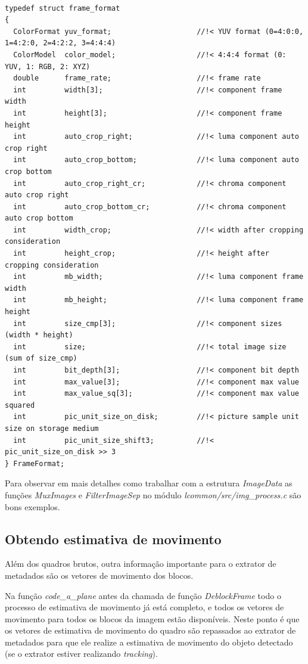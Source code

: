 \begin{lstlisting}

typedef struct frame_format
{
  ColorFormat yuv_format;                    //!< YUV format (0=4:0:0, 1=4:2:0, 2=4:2:2, 3=4:4:4)
  ColorModel  color_model;                   //!< 4:4:4 format (0: YUV, 1: RGB, 2: XYZ)
  double      frame_rate;                    //!< frame rate
  int         width[3];                      //!< component frame width
  int         height[3];                     //!< component frame height    
  int         auto_crop_right;               //!< luma component auto crop right
  int         auto_crop_bottom;              //!< luma component auto crop bottom
  int         auto_crop_right_cr;            //!< chroma component auto crop right
  int         auto_crop_bottom_cr;           //!< chroma component auto crop bottom
  int         width_crop;                    //!< width after cropping consideration
  int         height_crop;                   //!< height after cropping consideration
  int         mb_width;                      //!< luma component frame width
  int         mb_height;                     //!< luma component frame height    
  int         size_cmp[3];                   //!< component sizes (width * height)
  int         size;                          //!< total image size (sum of size_cmp)
  int         bit_depth[3];                  //!< component bit depth  
  int         max_value[3];                  //!< component max value
  int         max_value_sq[3];               //!< component max value squared
  int         pic_unit_size_on_disk;         //!< picture sample unit size on storage medium
  int         pic_unit_size_shift3;          //!< pic_unit_size_on_disk >> 3
} FrameFormat;

\end{lstlisting}

Para observar em mais detalhes como trabalhar com a estrutura \textit{ImageData} as funções \textit{MuxImages} e \textit{FilterImageSep} no módulo \textit{lcommon/src/img\_process.c} são bons exemplos.


\subsection{ Obtendo estimativa de movimento }


Além dos quadros brutos, outra informação importante para o extrator de metadados são os vetores de movimento dos blocos.

Na função \textit{code\_a\_plane} antes da chamada de função \textit{DeblockFrame} todo o processo de estimativa de movimento já está completo, e todos os vetores de movimento para todos os blocos da imagem estão disponíveis. Neste ponto é que os vetores de estimativa de movimento do quadro são repassados ao extrator de metadados para que ele realize a estimativa de movimento do objeto detectado (se o extrator estiver realizando \textit{tracking}).

